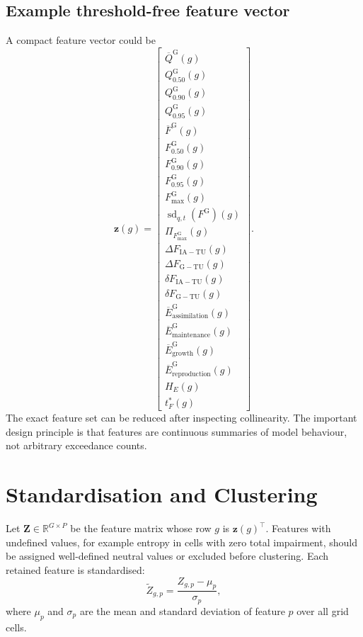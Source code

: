 \documentclass[11pt]{article}
\begin{document}
\subsection{Example threshold-free feature vector}
A compact feature vector could be
\begin{equation}
\bm{z}(g)=
\begin{bmatrix}
\overline{Q}^{\mathrm{G}}(g)\\
Q_{0.50}^{\mathrm{G}}(g)\\
Q_{0.90}^{\mathrm{G}}(g)\\
Q_{0.95}^{\mathrm{G}}(g)\\
\overline{F}^{\mathrm{G}}(g)\\
F_{0.50}^{\mathrm{G}}(g)\\
F_{0.90}^{\mathrm{G}}(g)\\
F_{0.95}^{\mathrm{G}}(g)\\
F_{\max}^{\mathrm{G}}(g)\\
\operatorname{sd}_{q,t}(F^{\mathrm{G}})(g)\\
\Pi_{F_{\max}^{\mathrm{G}}}(g)\\
\Delta F_{\mathrm{IA}-\mathrm{TU}}(g)\\
\Delta F_{\mathrm{G}-\mathrm{TU}}(g)\\
\delta F_{\mathrm{IA}-\mathrm{TU}}(g)\\
\delta F_{\mathrm{G}-\mathrm{TU}}(g)\\
\overline{E}_{\mathrm{assimilation}}^{\mathrm{G}}(g)\\
\overline{E}_{\mathrm{maintenance}}^{\mathrm{G}}(g)\\
\overline{E}_{\mathrm{growth}}^{\mathrm{G}}(g)\\
\overline{E}_{\mathrm{reproduction}}^{\mathrm{G}}(g)\\
H_E(g)\\
t^*_F(g)
\end{bmatrix}.
\end{equation}
The exact feature set can be reduced after inspecting collinearity. The important design principle is that
features are continuous summaries of model behaviour, not arbitrary exceedance counts.

\section{Standardisation and Clustering}
Let $\mathbf{Z}\in\mathbb{R}^{G\times P}$ be the feature matrix whose row $g$ is $\bm{z}(g)^{\top}$.
Features with undefined values, for example entropy in cells with zero total impairment, should be assigned
well-defined neutral values or excluded before clustering. Each retained feature is standardised:
\begin{equation}
\widetilde{Z}_{g,p}=\frac{Z_{g,p}-\mu_p}{\sigma_p},
\end{equation}
where $\mu_p$ and $\sigma_p$ are the mean and standard deviation of feature $p$ over all grid cells.
\end{document}

